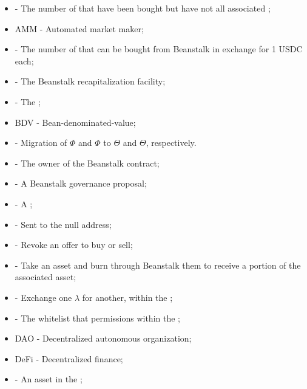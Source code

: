 \documentclass[class=article, crop=false]{standalone}
\begin{document}
\begin{itemize}[topsep=0pt, itemsep=3pt,leftmargin=16pt]
    \item[]  - \hypertarget{ht13}{The number of  that have been bought but have not  all associated };
    \item[] AMM - \hypertarget{ht14}{Automated market maker};
    \item[]  - \hypertarget{ht15}{The number of  that can be bought from Beanstalk in exchange for 1 USDC each};
    \item[]  - \hypertarget{ht18}{The Beanstalk recapitalization facility};
    \item[]  - \hypertarget{ht19}{The };
    \item[] BDV - \hypertarget{ht20}{Bean-denominated-value};
    \item[]  - Migration of  $\Phi$ and  $\Phi$ to  $\Theta$ and  $\Theta$, respectively.
    \item[]  - \hypertarget{ht21}{The owner of the Beanstalk contract};
    \item[]  - \hypertarget{ht22}{A Beanstalk governance proposal};
    \item[]  - \hypertarget{ht23}{A };
    \item[]  - \hypertarget{ht24}{Sent to the null address};
    \item[]  - \hypertarget{ht34}{Revoke an offer to buy or sell};
    \item[]  - \hypertarget{ht35}{Take an  asset and burn through Beanstalk them to receive a portion of the associated  asset};
    \item[]  - \hypertarget{ht36}{Exchange one  $\lambda$ for another, within the };
    \item[]  - \hypertarget{ht37}{The whitelist that permissions  within the };
    \item[] DAO - \hypertarget{ht43}{Decentralized autonomous organization};
    \item[] DeFi - \hypertarget{ht44}{Decentralized finance};
    \item[]  - \hypertarget{ht45}{An asset in the };

\end{itemize}
\end{document}
